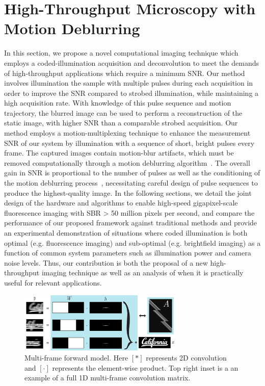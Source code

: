 \section{High-Throughput Microscopy with Motion Deblurring}
In this section, we propose a novel computational imaging technique which employs a coded-illumination acquisition and deconvolution to meet the demands of high-throughput applications which require a minimum SNR. Our method involves illumination the sample with multiple pulses during each acquisition in order to improve the SNR compared to strobed illumination, while maintaining a high acquisition rate. With knowledge of this pulse sequence and motion trajectory, the blurred image can be used to perform a reconstruction of the static image, with higher SNR than a comparable strobed acquisition. Our method employs a motion-multiplexing technique to enhance the measurement SNR of our system by illumination with a sequence of short, bright pulses every frame. The captured images contain motion-blur artifacts, which must be removed computationally through a motion deblurring algorithm~\cite{raskar2006coded}. The overall gain in SNR is proportional to the number of pulses as well as the conditioning of the motion deblurring process~\cite{agrawal2009optimal}, necessitating careful design of pulse sequences to produce the highest-quality image. In the following sections, we detail the joint design of the hardware and algorithms to enable high-speed gigapixel-scale fluorescence imaging with SBR > 50 million pixels per second, and compare the performance of our proposed framework against traditional methods and provide an experimental demonstration of situations where coded illumination is both optimal (e.g. fluorescence imaging) and sub-optimal (e.g. brightfield imaging) as a function of common system parameters such as illumination power and camera noise levels. Thus, our contribution is both the proposal of a new high-throughput imaging technique as well as an analysis of when it is practically useful for relevant applications.

\begin{figure}
  \centering
    \includegraphics[width=0.7\textwidth]{figures/fig_highthroughput_forward_model.pdf}
  \caption{\label{fig:highthroughput_forward_model}Multi-frame forward model. Here $[*]$ represents 2D convolution and $[\cdot]$ represents the element-wise product. Top right inset is a an example of a full 1D multi-frame convolution matrix.}
\end{figure}

